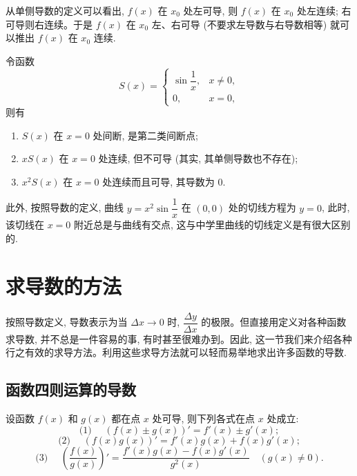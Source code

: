 \begin{remark}\label{remark:ma-4-source-19}
从单侧导数的定义可以看出, $f(x)$ 在 $x_0$ 处左可导, 则 $f(x)$ 在 $x_0$ 处左连续; 右可导则右连续。于是 $f(x)$ 在 $x_0$ 左、右可导 (不要求左导数与右导数相等) 就可以推出 $f(x)$ 在 $x_0$ 连续.
\end{remark}


\begin{example}\label{example:ma-4-1-8}
令函数
\[
  S(x)=
  \begin{cases}
    \sin\dfrac1x, & x\ne0,\\
    0, & x=0,
  \end{cases}
\]
则有
\begin{enumerate}
  \item $S(x)$ 在 $x=0$ 处间断, 是第二类间断点;
  \item $xS(x)$ 在 $x=0$ 处连续, 但不可导 (其实, 其单侧导数也不存在);
  \item $x^2S(x)$ 在 $x=0$ 处连续而且可导, 其导数为 $0$.
\end{enumerate}
此外, 按照导数的定义, 曲线 $y=x^2\sin\dfrac1x$ 在 $(0,0)$ 处的切线方程为 $y=0$, 此时, 该切线在 $x=0$ 附近总是与曲线有交点, 这与中学里曲线的切线定义是有很大区别的.
\end{example}


\section{求导数的方法}
\label{sec:ma-4-2}

按照导数定义, 导数表示为当 $\Delta x\to0$ 时, $\dfrac{\Delta y}{\Delta x}$ 的极限。但直接用定义对各种函数求导数, 并不总是一件容易的事, 有时甚至很难办到。因此, 这一节我们来介绍各种行之有效的求导方法。利用这些求导方法就可以轻而易举地求出许多函数的导数.

\subsection{函数四则运算的导数}
\label{subsec:ma-4-2-1}

\begin{theorem}\label{theorem:ma-4-2-1}
设函数 $f(x)$ 和 $g(x)$ 都在点 $x$ 处可导, 则下列各式在点 $x$ 处成立:
\[
  \text{(1) }\quad
  (f(x)\pm g(x))'=f'(x)\pm g'(x);
\]
\[
  \text{(2) }\quad
  (f(x)g(x))'=f'(x)g(x)+f(x)g'(x);
\]
\[
  \text{(3) }\quad
  \left(\frac{f(x)}{g(x)}\right)'
  =
  \frac{f'(x)g(x)-f(x)g'(x)}{g^2(x)}
  \quad(g(x)\ne0).
\]
\end{theorem}



